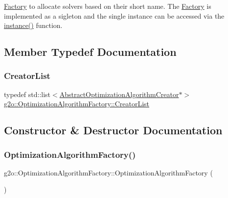 \mbox{\hyperlink{classg2o_1_1_factory}{Factory}} to allocate solvers based on their short name. The \mbox{\hyperlink{classg2o_1_1_factory}{Factory}} is implemented as a sigleton and the single instance can be accessed via the \mbox{\hyperlink{classg2o_1_1_optimization_algorithm_factory_a4fe827a82f01c74ef124e7a9a9c98707}{instance()}} function. 

\subsection{Member Typedef Documentation}
\mbox{\label{classg2o_1_1_optimization_algorithm_factory_a3ed210b94bf09b47e30d07da3766b4ec}} 
\subsubsection{\texorpdfstring{Creator\+List}{CreatorList}}
{\footnotesize\ttfamily typedef std\+::list$<$\mbox{\hyperlink{classg2o_1_1_abstract_optimization_algorithm_creator}{Abstract\+Optimization\+Algorithm\+Creator}}$\ast$$>$ \mbox{\hyperlink{classg2o_1_1_optimization_algorithm_factory_a3ed210b94bf09b47e30d07da3766b4ec}{g2o\+::\+Optimization\+Algorithm\+Factory\+::\+Creator\+List}}}



\subsection{Constructor \& Destructor Documentation}
\mbox{\label{classg2o_1_1_optimization_algorithm_factory_ac0e56515170544768e4cad9f2fede55c}} 
\subsubsection{\texorpdfstring{Optimization\+Algorithm\+Factory()}{OptimizationAlgorithmFactory()}}
{\footnotesize\ttfamily g2o\+::\+Optimization\+Algorithm\+Factory\+::\+Optimization\+Algorithm\+Factory (\begin{DoxyParamCaption}{ }\end{DoxyParamCaption})\hspace{0.3cm}{\ttfamily [protected]}}

